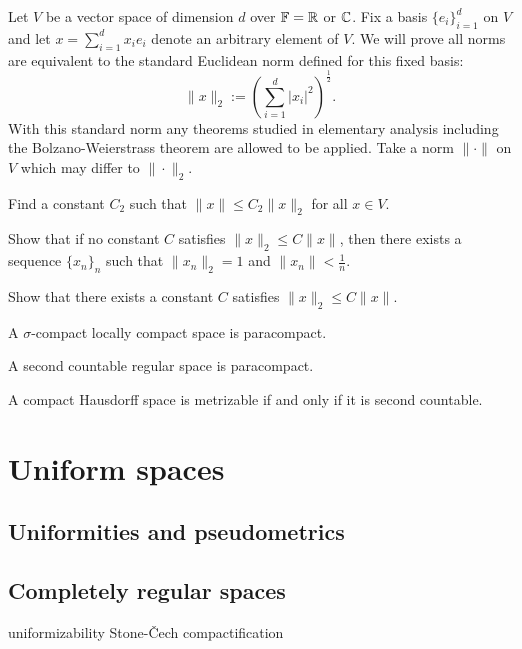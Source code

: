 \documentclass{../note}
\begin{document}
\begin{prb}
Let $V$ be a vector space of dimension $d$ over $\mathbb{F}=\mathbb{R}$ or $\mathbb{C}$.
Fix a basis $\{e_i\}_{i=1}^d$ on $V$ and let $x=\sum_{i=1}^dx_ie_i$ denote an arbitrary element of $V$.
We will prove all norms are equivalent to the standard Euclidean norm defined for this fixed basis:
\[\|x\|_2:=(\sum_{i=1}^d|x_i|^2)^{\frac12}.\]
With this standard norm any theorems studied in elementary analysis including the Bolzano-Weierstrass theorem are allowed to be applied.
Take a norm $\|\cdot\|$ on $V$ which may differ to $\|\cdot\|_2$.
\begin{parts}
\item Find a constant $C_2$ such that $\|x\|\le C_2\|x\|_2$ for all $x\in V$.
\item Show that if no constant $C$ satisfies $\|x\|_2\le C\|x\|$, then there exists a sequence $\{x_n\}_n$ such that $\|x_n\|_2=1$ and $\|x_n\|<\tfrac1n$.
\item Show that there exists a constant $C$ satisfies $\|x\|_2\le C\|x\|$.
\end{parts}
\end{prb}


\begin{prb}
\begin{parts}
\item A $\sigma$-compact locally compact space is paracompact.
\item A second countable regular space is paracompact.
\end{parts}
\end{prb}

\begin{prb}
A compact Hausdorff space is metrizable if and only if it is second countable.
\end{prb}




\chapter{Uniform spaces}

\section{Uniformities and pseudometrics}




\section{Completely regular spaces}
uniformizability
Stone-\v Cech compactification
\end{document}
